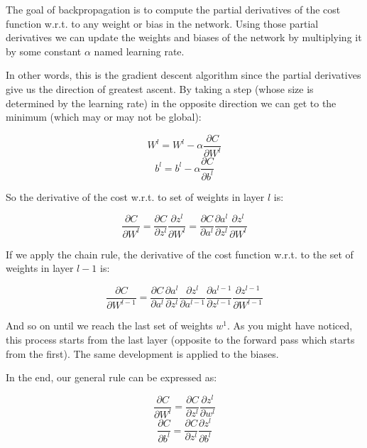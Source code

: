 \documentclass{article}
\begin{document}
The goal of backpropagation is to compute the partial derivatives of the cost function w.r.t. to any weight or bias in the network. Using those partial derivatives we can update the weights and biases of the network by multiplying it by some constant $\alpha$ named learning rate.

In other words, this is the gradient descent algorithm since the partial derivatives give us the direction of greatest ascent. By taking a step (whose size is determined by the learning rate) in the opposite direction we can get to the minimum (which may or may not be global):

\begin{equation}
W^l = W^l - \alpha\displaystyle\frac{\partial C}{\partial W^l}
\end{equation}
\begin{equation}
b^l = b^l - \alpha\displaystyle\frac{\partial C}{\partial b^l}
\end{equation}

So the derivative of the cost w.r.t. to set of weights in layer $l$ is:

\begin{equation}
\frac{\partial C}{\partial W^l} = \frac{\partial C}{\partial z^l}\frac{\partial z^l}{\partial W^l} = \frac{\partial C}{\partial a^l}\frac{\partial a^l}{\partial z^l}\frac{\partial z^l}{\partial W^l}
\end{equation}

If we apply the chain rule, the derivative of the cost function w.r.t. to the set of weights in layer $l-1$ is:

\begin{equation}
  \frac{\partial C}{\partial W^{l-1}} = \frac{\partial C}{\partial a^l}\frac{\partial a^l}{\partial z^l}\frac{\partial z^l}{\partial a^{l-1}}\frac{\partial a^{l-1}}{\partial z^{l-1}}\frac{\partial z^{l-1}}{\partial W^{l-1}}
\end{equation}

And so on until we reach the last set of weights $w^1$. As you might have noticed, this process starts from the last layer (opposite to the forward pass which starts from the first). The same development is applied to the biases.

In the end, our general rule can be expressed as:

\begin{equation}
\frac{\partial C}{\partial W^l} = \frac{\partial C}{\partial z^l}\frac{\partial z^l}{\partial w^l}
\end{equation}
\begin{equation}
\frac{\partial C}{\partial b^l} = \frac{\partial C}{\partial z^l}\frac{\partial z^l}{\partial b^l}
\end{equation}
\end{document}
